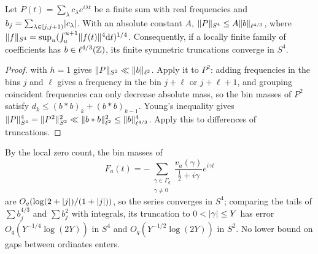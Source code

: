 \begin{lemma}\label{zer:lem:bins4}
Let $P(t)=\sum_\lambda c_\lambda e^{i\lambda t}$ be a finite sum with real frequencies and
$b_j=\sum_{\lambda\in[j,j+1)}\lvert c_\lambda\rvert$. With an absolute constant $A$,
$\lVert P\rVert_{S^4}\le A\lVert b\rVert_{\ell^{4/3}}$, where
$\lVert f\rVert_{S^4}=\sup_u(\int_u^{u+1}\lVert f(t)\rVert^4\mathrm{d} t)^{1/4}$. Consequently, if a locally finite family
of coefficients has $b\in\ell^{4/3}(\mathbb{Z})$, its finite symmetric truncations converge in $S^4$.
\end{lemma}
\begin{proof}
 with $h=1$ gives $\lVert P\rVert_{S^2}\ll\lVert b\rVert_{\ell^2}$. Apply it to $P^2$: adding
frequencies in the bins $j$ and $\ell$ gives a frequency in the bin $j+\ell$ or $j+\ell+1$, and
grouping coincident frequencies can only decrease absolute mass, so the bin masses of $P^2$ satisfy
$d_k\le(b*b)_k+(b*b)_{k-1}$. Young's inequality gives
$\lVert P\rVert_{S^4}^4=\lVert P^2\rVert_{S^2}^2\ll\lVert b*b\rVert_{\ell^2}^2\le\lVert b\rVert_{\ell^{4/3}}^4$. Apply this to
differences of truncations.
\end{proof}

By the local zero count, the bin masses of
\[
 F_a(t)=-\sum_{\substack{\gamma\in\Gamma_q\\\gamma\ne0}}\frac{v_a(\gamma)}{\tfrac12+i\gamma}e^{i\gamma t}
\]
are $O_q(\log(2+\lvert j\rvert)/(1+\lvert j\rvert))$, so the series converges in $S^4$; comparing the tails of
$\sum b_j^{4/3}$ and $\sum b_j^2$ with integrals, its truncation to $0<\lvert\gamma\rvert\le Y$ has error
$O_q(Y^{-1/4}\log(2Y))$ in $S^4$ and $O_q(Y^{-1/2}\log(2Y))$ in $S^2$. No lower bound on gaps between
ordinates enters.

